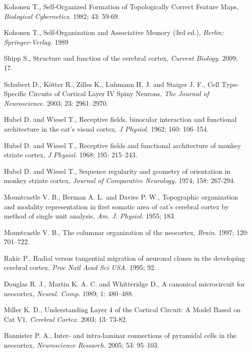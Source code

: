 \documentclass[11pt,a4paper]{article}
\begin{document}
\begin{thebibliography}{9}
  Kohonen T.,
  Self-Organized Formation of Topologically Correct Feature Maps,
  \emph{Biological Cybernetics.} 1982; 43: 59-69.

  Kohonen T.,
  Self-Organization and Associative Memory (3rd ed.),
  \emph{Berlin: Springer-Verlag.} 1989

  Shipp S.,
  Structure and function of the cerebral cortex,
  \emph{Current Biology.} 2009; 17.

  Schubert D., Kötter R., Zilles K., Luhmann H. J. and Staiger J. F.,
  Cell Type-Specific Circuits of Cortical Layer IV Spiny Neurons,
  \emph{The Journal of Neuroscience.} 2003; 23: 2961–2970.

  Hubel D. and Wiesel T.,
  Receptive fields, binocular interaction and functional architecture in the cat’s visual cortex,
  \emph{J Physiol.} 1962; 160: 106–154.

  Hubel D. and Wiesel T.,
  Receptive fields and functional architecture of monkey striate cortex,
  \emph{J Physiol.} 1968; 195: 215–243.

  Hubel D. and Wiesel T.,
  Sequence regularity and geometry of orientation in monkey striate cortex,
  \emph{Journal of Comparative Neurology.} 1974; 158: 267-294.

  Mountcastle V. B., Berman A. L. and  Davies P. W.,
  Topographic organization and modality representation in first somatic area of cat’s cerebral cortex by method of single unit analysis,
  \emph{Am. J. Physiol.} 1955; 183.

  Mountcastle V. B.,
  The columnar organization of the neocortex,
  \emph{Brain.} 1997; 120: 701–722.

  Rakic P.,
  Radial versus tangential migration of neuronal clones in the developing cerebral cortex,
  \emph{Proc Natl Acad Sci USA.} 1995; 92.

  Douglas R. J., Martin K. A. C. and Whitteridge D.,
  A canonical microcircuit for neocortex,
  \emph{Neural. Comp.} 1989; 1: 480–488.

  Miller K. D.,
  Understanding Layer 4 of the Cortical Circuit: A Model Based on Cat V1,
  \emph{Cerebral Cortex.} 2003; 13: 73-82.

  Bannister P. A.,
  Inter- and intra-laminar connections of pyramidal cells in the neocortex,
  \emph{Neuroscience Research.} 2005; 53: 95–103.


\end{thebibliography}
\end{document}
